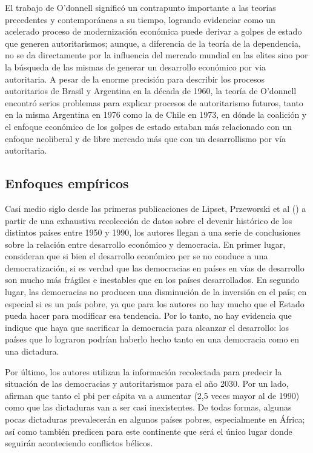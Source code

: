 \documentclass{article}
\begin{document}
El trabajo de O'donnell significó un contrapunto importante a las teorías precedentes y
contemporáneas a su tiempo, logrando evidenciar como un acelerado proceso de modernización
económica puede derivar a golpes de estado que generen autoritarismos; aunque, a diferencia
de la teoría de la dependencia, no se da directamente por la influencia del mercado mundial
en las elites sino por la búsqueda de las mismas de generar un desarrollo económico por via
autoritaria. A pesar de la enorme precisión para describir los procesos autoritarios de 
Brasil y Argentina en la década de 1960, la teoría de O'donnell encontró serios problemas
para explicar procesos de autoritarismo futuros, tanto en la misma Argentina en 1976 como
la de Chile en 1973, en dónde la coalición y el enfoque económico de los golpes de estado
estaban más relacionado con un enfoque neoliberal y de libre mercado más que con un 
desarrollismo por vía autoritaria.

\subsection{Enfoques empíricos}

Casi medio siglo desde las primeras publicaciones de Lipset, Przeworski et al
(\citeyear{przeworski2000democracy}) a partir de una exhaustiva recolección de datos
sobre el devenir histórico de los distintos países entre 1950 y 1990, los autores llegan
a una serie de conclusiones sobre la relación entre desarrollo económico y democracia. En 
primer lugar, consideran que si bien el desarrollo económico per se no conduce a una 
democratización, si es verdad que las democracias en países en vías de desarrollo son 
mucho más frágiles e inestables que en los países desarrollados. En segundo lugar,
las democracias no producen una disminución de la inversión en el país; en especial si es
un país pobre, ya que para los autores no hay mucho que el Estado pueda hacer para modificar
esa tendencia. Por lo tanto, no hay evidencia que indique que haya que sacrificar la 
democracia para alcanzar el desarrollo: los países que lo lograron podrían
haberlo hecho tanto en una democracia como en una dictadura.

Por último, los autores utilizan la información recolectada para predecir la situación
de las democracias y autoritarismos para el año 2030. Por un lado, afirman que tanto
el pbi per cápita va a aumentar (2,5 veces mayor al de 1990) 
como que las dictaduras van a ser casi inexistentes. De todas formas, algunas pocas 
dictaduras prevalecerán en algunos países pobres, especialmente en África; así como
también predicen para este continente que será el único lugar donde seguirán aconteciendo
conflictos bélicos.
\end{document}
